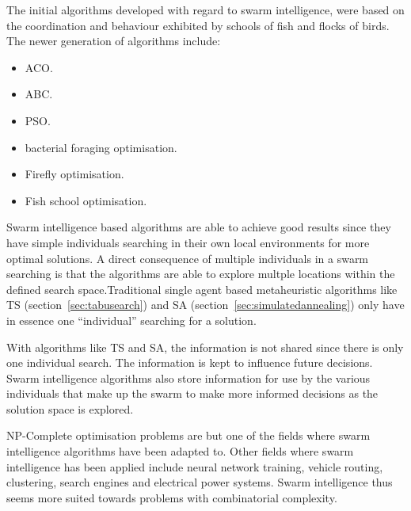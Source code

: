 The initial algorithms developed with regard to swarm intelligence, were based on the coordination and behaviour exhibited by schools of fish and flocks of birds. The newer generation of algorithms include\cite{SwarmArt,ChaoticSwarmIntel,BeeJobShop}:
\begin{itemize}
\item \gls{ACO}\cite{SwarmArt}.
\item \gls{ABC}\cite{BeeJobShop}.
\item \gls{PSO}\cite{ChaoticSwarmIntel}. 
\item bacterial foraging optimisation\cite{CompuIntelligenceIntro}.
\item Firefly optimisation\cite{CompuIntelligenceIntro}.
\item Fish school optimisation\cite{CompuIntelligenceIntro}.
\end{itemize}


Swarm intelligence based algorithms are able to achieve good results since they have simple individuals searching in their own local environments for more optimal solutions\cite{CompuIntelligenceIntro,FundamentalSwarm}. A direct consequence of multiple individuals in a swarm searching is that the algorithms are able to explore multple locations within the defined search space\cite{CompuIntelligenceIntro,FundamentalSwarm}.Traditional single agent based metaheuristic algorithms like \gls{TS} (section~\ref{sec:tabusearch}) and \gls{SA} (section~\ref{sec:simulatedannealing}) only have in essence one ``individual'' searching for a solution\cite{CompuIntelligenceIntro,FundamentalSwarm}. 

With algorithms like \gls{TS} and \gls{SA}, the information is not shared since there is only one individual search\cite{CompuIntelligenceIntro,FundamentalSwarm,SASingleMultiObj,TSHazardous}. The information is kept to influence future decisions\cite{AIModernApproach,TabuMontemanniSmith,TabuVechicleRoutingWithTimeWindows,CurveFittingSA,EcoEquilSA}. Swarm intelligence algorithms also store information for use by the various individuals that make up the swarm to make more informed decisions as the solution space is explored\cite{CompuIntelligenceIntro,FundamentalSwarm}.

NP-Complete optimisation problems are but one of the fields where swarm intelligence algorithms have been adapted to. Other fields where swarm intelligence has been applied include neural network training\cite{CompuIntelligenceIntro}, vehicle routing\cite{ACOSurvey}, clustering\cite{AntSwarmClustering}, search engines and electrical power systems\cite{SAElectricPower}. Swarm intelligence thus seems more suited towards problems with combinatorial complexity\cite{SIOPDenby}.

